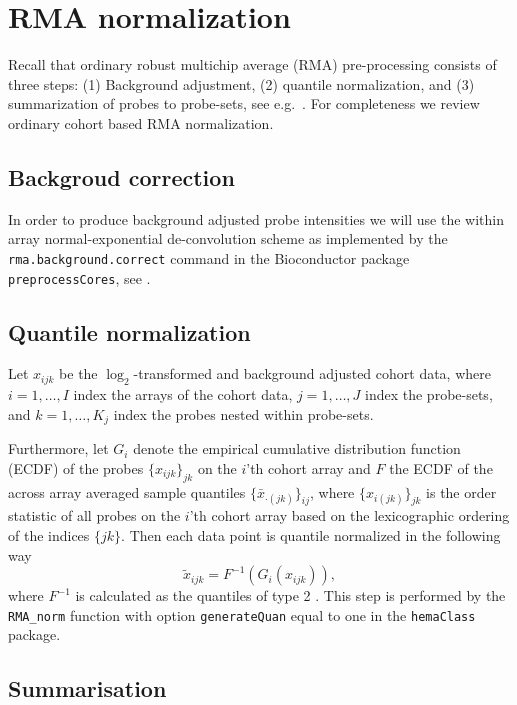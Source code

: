 \documentclass{article}
\begin{document}
\section{RMA normalization}
Recall that ordinary robust multichip average (RMA) pre-processing consists of three steps: (1) Background adjustment, (2) quantile normalization, and (3) summarization of probes to probe-sets, see e.g.\ \citep{Irizarry2003, Irizarry2003b}. For completeness we review ordinary cohort based RMA normalization.

\subsection{Backgroud correction}
In order to produce background adjusted probe intensities we will use the within array normal-exponential de-convolution scheme as implemented by the \texttt{rma.background.correct} command in the Bioconductor package \texttt{preprocessCores}, see
\citep{Irizarry2003b,Bolstad2004}.


\subsection{Quantile normalization}
Let $x_{ijk}$ be the $\log_2$-transformed and background adjusted cohort data, where $i = 1,\dots,I$ index the arrays of the cohort data, $j=1,\dots,J$  index the probe-sets, and $k=1,\dots,K_j$ index the probes nested within probe-sets.

Furthermore, let $G_i$ denote the empirical cumulative distribution function (ECDF) of the probes $\{x_{ijk}\}_{jk}$ on the $i$'th cohort array and $F$ the ECDF of the across array averaged sample quantiles $\{\bar{x}_{\cdot (jk)}\}_{ij}$, where $\{x_{i(jk)}\}_{jk}$ is the order statistic of all probes on the $i$'th cohort array based on the lexicographic ordering of the indices $\{jk\}$. Then each data point is quantile normalized in the following way
\begin{equation*}
     \tilde{x}_{ijk} = F^{-1}(G_i(x_{ijk})),
\end{equation*}
where $F^{-1}$ is calculated as the quantiles of type 2 \citep{Hyndman1996}.
This step is performed by the \texttt{RMA\_norm} function with option \texttt{generateQuan} equal to one in the \texttt{hemaClass} package.

\subsection{Summarisation}
\end{document}
